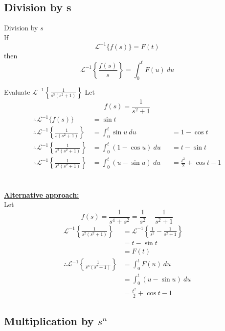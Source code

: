 \documentclass[12pt]{article}
\newcommand{\Lapinv}{\mathscr{L}^{-1}}
\begin{document}
\subsection{Division by s}

\begin{theorem}{Division by $s$}{}
    \\If \[
        \Lapinv \{ f(s) \} = F(t)
    \] then \[
        \Lapinv \left\{ \frac{f(s)}{s} \right\} = \int_{0}^{t} {F(u)} \: d{u}
    \]
\end{theorem}

\begin{example}{Evaluate $\displaystyle \Lapinv \left\{ \frac{1}{s^3(s^2+1)} \right\}$}{}
    Let \[
        f(s) = \frac{1}{s^2+1}
    \]
    \begin{align*}
        \therefore \Lapinv \{ f(s) \} &= \sin{t} \\
        \therefore \Lapinv \left\{ \frac{1}{s(s^2+1)} \right\} &= \int_{0}^{t} {\sin{u}} \: d{u} &&= 1-\cos{t}\\
        \therefore \Lapinv \left\{ \frac{1}{s^2(s^2+1)} \right\} &= \int_{0}^{t} {(1-\cos{u})} \: d{u} &&= t - \sin{t} \\
        \therefore \Lapinv \left\{ \frac{1}{s^3(s^2+1)} \right\} &= \int_{0}^{t} {(u-\sin{u})} \: d{u} &&= \frac{t^2}{2} + \cos{t} - 1
    \end{align*}\\~\\
    
    \underline{\textbf{Alternative approach: }}
    \\Let \[
        f(s) = \frac{1}{s^4 + s^2} = \frac{1}{s^2} - \frac{1}{s^2+1}
    \]
    \begin{align*}
        \Lapinv \left\{ \frac{1}{s^2(s^2+1)} \right\} &= \Lapinv \left\{ \frac{1}{s^2} - \frac{1}{s^2+1} \right\} \\
        &= t - \sin{t} \\
        &= F(t) \\
        \therefore \Lapinv \left\{ \frac{1}{s^3(s^2+1)} \right\} &= \int_{0}^{t} {F(u)} \: d{u} \\
        &= \int_{0}^{t} {(u-\sin{u})} \: d{u} \\
        &= \frac{t^2}{2} + \cos{t} - 1
    \end{align*}
\end{example}

\subsection{Multiplication by $s^n$}
\end{document}
